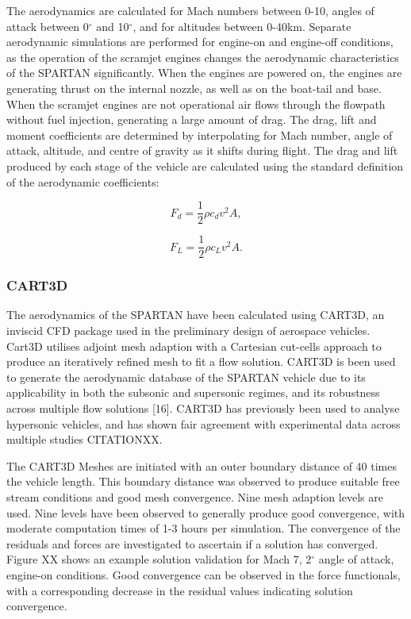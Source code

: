 The aerodynamics are calculated for Mach numbers between 0-10, angles of attack between 0$^\circ$ and 10$^\circ$, and for altitudes between 0-40km. Separate aerodynamic simulations are performed for engine-on and engine-off conditions, as the operation of the scramjet engines changes the aerodynamic characteristics of the SPARTAN significantly. When the engines are powered on, the engines are generating thrust on the internal nozzle, as well as on the boat-tail and base.  When the scramjet engines are not operational air flows through the flowpath without fuel injection, generating a large amount of drag. 
The drag, lift and moment coefficients are determined by interpolating for Mach number, angle of attack, altitude, and centre of gravity as it shifts during flight.
		The drag and lift produced by each stage of the vehicle are calculated using the standard definition of the aerodynamic coefficients:
		
		\begin{equation}
		F_d = \frac{1}{2}\rho c_d v^2 A ,
		\end{equation}
		
		\begin{equation}
		F_L = \frac{1}{2}\rho c_L v^2 A .
		\end{equation}
		
		\subsubsection{CART3D}

				The aerodynamics of the SPARTAN have been calculated using CART3D, an inviscid CFD package used in the preliminary design of aerospace vehicles. Cart3D utilises adjoint mesh adaption with a Cartesian cut-cells approach to produce an iteratively refined mesh to fit a flow solution. CART3D is
				been used to generate the aerodynamic database of the SPARTAN vehicle due to its applicability in both the subsonic
				and supersonic regimes, and its robustness across multiple flow solutions [16]. CART3D has previously been used to
				analyse hypersonic vehicles, and has shown fair agreement with experimental data across multiple studies CITATIONXX.
				
						The CART3D Meshes are initiated with an outer boundary distance of 40 times the vehicle length. This boundary distance was observed to produce suitable free stream conditions and good mesh convergence. Nine mesh adaption levels are used. Nine levels have been observed to generally produce good convergence, with moderate computation times of 1-3 hours per simulation. The convergence of the residuals and forces are investigated to ascertain if a solution has converged. Figure XX shows an example solution validation for Mach 7, 2$^\circ$ angle of attack, engine-on conditions. Good convergence can be observed in the force functionals, with a corresponding decrease in the residual values indicating solution convergence.  
						
